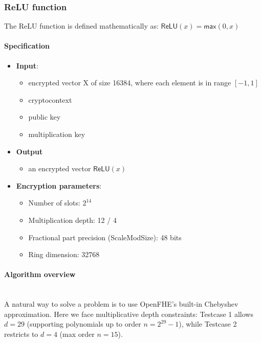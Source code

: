 \documentclass[article]{iacrtrans}
\begin{document}
\subsubsection{ReLU function}
The ReLU function is defined mathematically as:
$\textsf{ReLU}(x)=\textsf{max}(0,x)$


\paragraph{Specification}

 \begin{itemize}
    \item \textbf{Input}: 
        \begin{itemize}
            \item encrypted vector X of size  16384, where each element is in range $[-1, 1]$
            \item cryptocontext
            \item public key
            \item multiplication key
        \end{itemize}
    \item \textbf{Output}
        \begin{itemize}
            \item an encrypted vector $\textsf{ReLU}(x)$
        \end{itemize}
    \item \textbf{Encryption parameters}:
        \begin{itemize}
             \item Number of slots: $2^{14}$ 
            \item Multiplication depth: 12 / 4
            \item Fractional part precision (ScaleModSize): 48 bits
            \item Ring dimension: 32768
        \end{itemize}
\end{itemize}

\paragraph{Algorithm overview}\mbox{}\\
 
A natural way to solve a problem is to use OpenFHE's built-in Chebyshev approximation. Here we face multiplicative depth constraints: Testcase 1 allows $d=29$ (supporting polynomials up to order $n=2^{29}-1$), while Testcase 2 restricts to $d=4$ (max order $n=15$).
\end{document}
